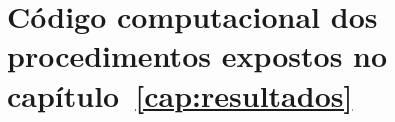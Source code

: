 \chapter{Código computacional dos procedimentos expostos no capítulo~\ref{cap:resultados}}
\label{cap:codigoProc}


